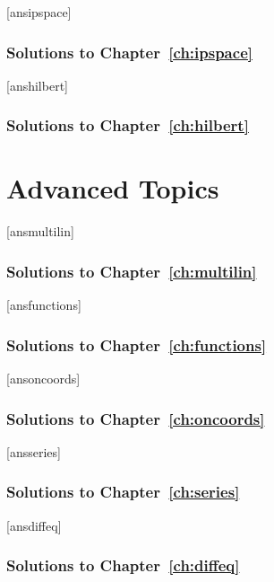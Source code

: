 \documentclass[12pt]{book}
\theoremstyle{definition}
\numberwithin{exercise}{section}
\begin{document}
	[ansipspace]
	
	\newpage{}
	\section*{Solutions to Chapter~\ref{ch:ipspace}}
	

	[anshilbert]
	
	\newpage{}
	\section*{Solutions to Chapter~\ref{ch:hilbert}}
	


\part{Advanced Topics}
	[ansmultilin]
	
	\newpage{}
	\section*{Solutions to Chapter~\ref{ch:multilin}}
	

	[ansfunctions]
	
	\newpage{}
	\section*{Solutions to Chapter~\ref{ch:functions}}
	

	[ansoncoords]
	
	\newpage{}
	\section*{Solutions to Chapter~\ref{ch:oncoords}}
	

	[ansseries]
	
	\newpage{}
	\section*{Solutions to Chapter~\ref{ch:series}}
	

	[ansdiffeq]
	
	\newpage{}
	\section*{Solutions to Chapter~\ref{ch:diffeq}}
	
\end{document}
